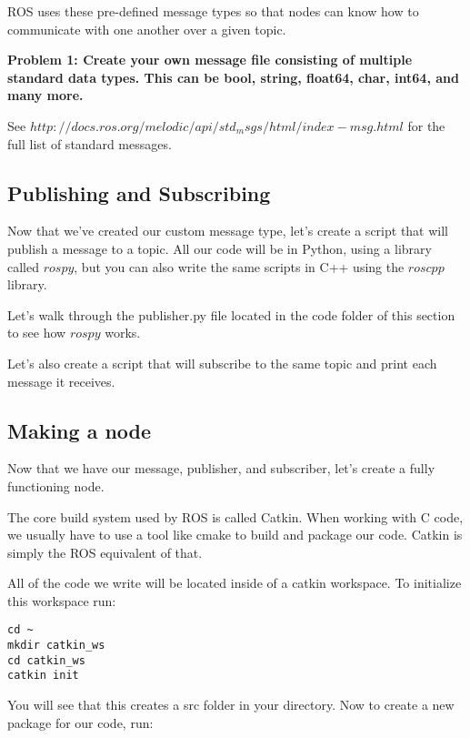 ROS uses these pre-defined message types so that nodes can know how to communicate with one another over a given topic.

\textbf{Problem 1: Create your own message file consisting of multiple standard data types. This can be bool, string, float64, char, int64, and many more. }

See $http://docs.ros.org/melodic/api/std_msgs/html/index-msg.html$ for the full list of standard messages.


\subsection{Publishing and Subscribing}
Now that we've created our custom message type, let's create a script that will publish a message to a topic. All our code will be in Python, using a library called $rospy$, but you can also write the same scripts in C++ using the $roscpp$ library. 

Let's walk through the publisher.py file located in the code folder of this section to see how $rospy$ works.


Let's also create a script that will subscribe to the same topic and print each message it receives.



\subsection{Making a node}
Now that we have our message, publisher, and subscriber, let's create a fully functioning node.

The core build system used by ROS is called Catkin. When working with C code, we usually have to use a tool like cmake to build and package our code. Catkin is simply the ROS equivalent of that. 

All of the code we write will be located inside of a catkin workspace. To initialize this workspace run:

\begin{lstlisting}
cd ~
mkdir catkin_ws 
cd catkin_ws
catkin init
\end{lstlisting}
You will see that this creates a src folder in your directory. Now to create a new package for our code, run:

